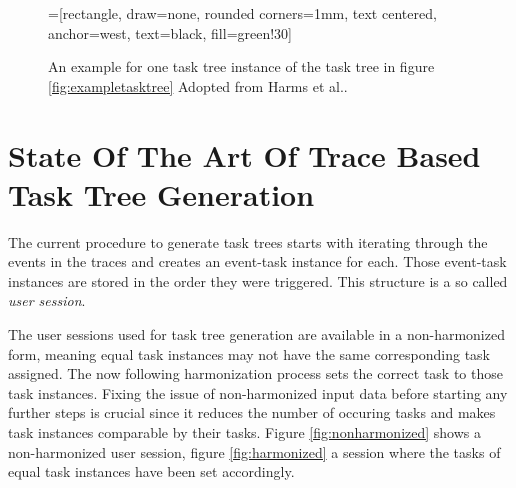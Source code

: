 	\begin{figure}[h]
		=[rectangle, draw=none, rounded corners=1mm,
		        text centered, anchor=west, text=black, fill=green!30]

		\caption{An example for one task tree instance of the task tree in figure \ref{fig:exampletasktree} Adopted from Harms et al.\cite{harms2013}.}
		\label{fig:exampletaskinstancetree}
	\end{figure}

\clearpage
\section{State Of The Art Of Trace Based Task Tree Generation}
The current procedure to generate task trees\cite{harms2013} starts with iterating through the events in the traces and creates an event-task instance for each.
Those event-task instances are stored in the order they were triggered.  This structure is a so called \textit{user session}.

The user sessions used for task tree generation are available in a non-harmonized form,
meaning equal task instances may not have the same corresponding task assigned. 
The now following harmonization process sets the correct task to those task instances.
Fixing the issue of non-harmonized input data before starting any further steps is crucial since it reduces the number of occuring tasks and makes task instances
comparable by their tasks. Figure \ref{fig:nonharmonized} shows a non-harmonized user session, figure \ref{fig:harmonized} a session where the tasks of equal task instances have been set accordingly.

